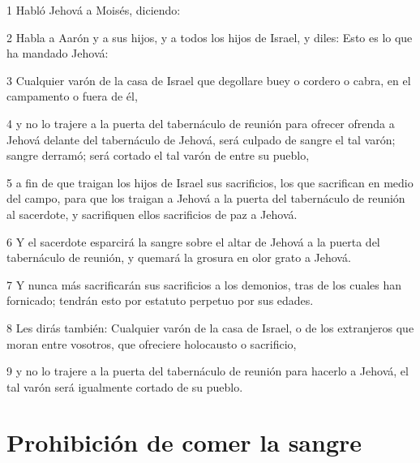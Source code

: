 \par 1 Habló Jehová a Moisés, diciendo:
\par 2 Habla a Aarón y a sus hijos, y a todos los hijos de Israel, y diles: Esto es lo que ha mandado Jehová:
\par 3 Cualquier varón de la casa de Israel que degollare buey o cordero o cabra, en el campamento o fuera de él,
\par 4 y no lo trajere a la puerta del tabernáculo de reunión para ofrecer ofrenda a Jehová delante del tabernáculo de Jehová, será culpado de sangre el tal varón; sangre derramó; será cortado el tal varón de entre su pueblo,
\par 5 a fin de que traigan los hijos de Israel sus sacrificios, los que sacrifican en medio del campo, para que los traigan a Jehová a la puerta del tabernáculo de reunión al sacerdote, y sacrifiquen ellos sacrificios de paz a Jehová.
\par 6 Y el sacerdote esparcirá la sangre sobre el altar de Jehová a la puerta del tabernáculo de reunión, y quemará la grosura en olor grato a Jehová.
\par 7 Y nunca más sacrificarán sus sacrificios a los demonios, tras de los cuales han fornicado; tendrán esto por estatuto perpetuo por sus edades.
\par 8 Les dirás también: Cualquier varón de la casa de Israel, o de los extranjeros que moran entre vosotros, que ofreciere holocausto o sacrificio,
\par 9 y no lo trajere a la puerta del tabernáculo de reunión para hacerlo a Jehová, el tal varón será igualmente cortado de su pueblo. 

\section*{Prohibición de comer la sangre}

